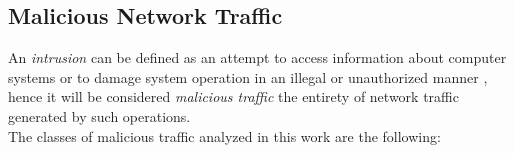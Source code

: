 
\subsection{Malicious Network Traffic}
\label{subsec:malicious-traffic}

An \textit{intrusion} can be defined as an attempt to access information about computer systems or to damage system operation in an illegal or unauthorized manner \cite{Liu2019}, hence it will be considered \textit{malicious traffic} the entirety of network traffic generated by such operations. \\
The classes of malicious traffic analyzed in this work are the following:

